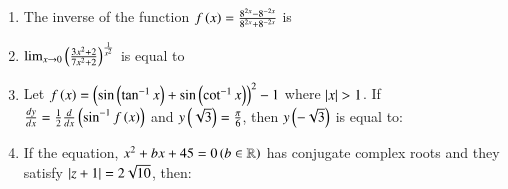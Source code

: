 \documentclass[journal,12pt,onecolumn]{IEEEtran}
\theoremstyle{remark}
\begin{document}
\begin{enumerate}
\item The inverse of the function $f\left(x\right)=\frac{8^{2x}-8^{-2x}}{8^{2x}+8^{-2x}}$ is
\begin{enumerate}
\end{enumerate}

\item $\lim_{x\to 0}\left(\frac{3x^2+2}{7x^2+2}\right)^{\frac{1}{x^2}}$ is equal to
\begin{enumerate}
\end{enumerate}

\item Let $f\left(x\right)=\left(\sin\left({\tan^{-1}x}\right)+\sin\left({\cot^{-1}x}\right)\right)^2-1$ where $\left\vert x\right\vert>1$. If\newline
$\frac{dy}{dx}=\frac{1}{2}\frac{d}{dx}\left(\sin^{-1}f\left(x\right)\right)$\newline
and $y\left(\sqrt{3}\right)=\frac{\pi}{6}$, then $y\left(-\sqrt{3}\right)$ is equal to:
\begin{enumerate}
\end{enumerate}

\item If the equation, $x^2+bx+45=0 \left(b\in\mathbb{R}\right)$ has conjugate complex roots and they satisfy $\left\vert z+1\right\vert=2\sqrt{10}$, then:
\begin{enumerate}
\end{enumerate}


\end{enumerate}
\end{document}
